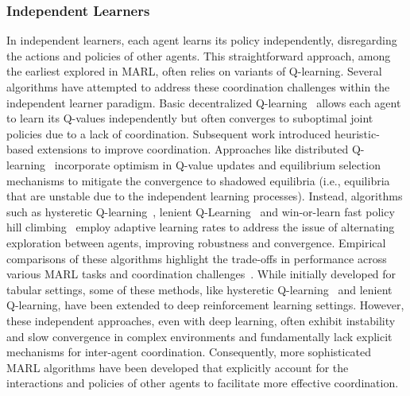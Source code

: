 \documentclass[sigconf]{acmart}
\begin{document}
\subsubsection{Independent Learners}
In independent learners, each agent learns its policy independently, disregarding the actions and policies of other agents. 
This straightforward approach, among the earliest explored in MARL, often relies on variants of Q-learning. 
%
Several algorithms have attempted to address these coordination challenges within the independent learner paradigm. 
Basic decentralized Q-learning~\cite{tan1993multi} allows each agent to learn its Q-values independently but often converges to suboptimal joint policies due to a lack of coordination. 
Subsequent work introduced heuristic-based extensions to improve coordination.
Approaches like distributed Q-learning~\cite{lauer2000algorithm} incorporate optimism in Q-value updates and equilibrium selection mechanisms to mitigate the convergence to shadowed equilibria (i.e., equilibria that are unstable due to the independent learning processes). 
Instead, algorithms such as hysteretic Q-learning~\cite{matignon2007hysteretic}, lenient Q-Learning~\cite{bloembergen2010lenient} and win-or-learn fast policy hill climbing~\cite{bowling2002multiagent} employ adaptive learning rates to address the issue of alternating exploration between agents, improving robustness and convergence.
%
Empirical comparisons of these algorithms highlight the trade-offs in performance across various MARL tasks and coordination challenges~\cite{matignon2012independent}. 
While initially developed for tabular settings, some of these methods, like hysteretic Q-learning~\cite{palmer2017lenient} and lenient Q-learning, have been extended to deep reinforcement learning settings. 
However, these independent approaches, even with deep learning, often exhibit instability and slow convergence in complex environments and fundamentally lack explicit mechanisms for inter-agent coordination. 
Consequently, more sophisticated MARL algorithms have been developed that explicitly account for the interactions and policies of other agents to facilitate more effective coordination.
\end{document}
